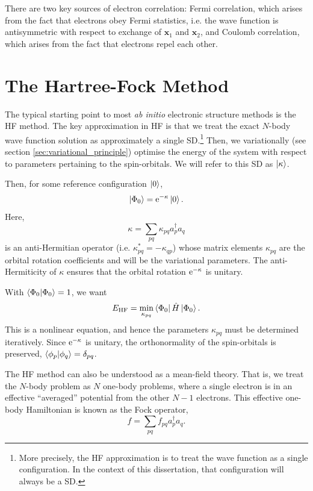 There are two key sources of electron correlation: Fermi correlation, which arises from the fact that electrons obey Fermi statistics, i.e. the wave function is antisymmetric with respect to exchange of $\bm x_1$ and $\bm x_2$, and Coulomb correlation, which arises from the fact that electrons repel each other.

\section{The Hartree-Fock Method}
\label{sec:hf}

The typical starting point to most \emph{ab initio} electronic structure methods is the \gls{HF} method.\cite{hartreeWave1928,fockNaherungsmethode1930,slaterNote1930} The key approximation in \gls{HF} is that we treat the exact $N$-body wave function solution as approximately a single \gls{SD}.\footnote{More precisely, the \gls{HF} approximation is to treat the wave function as a single configuration. In the context of this dissertation, that configuration will always be a \gls{SD}.} Then, we variationally (see section \ref{sec:variational_principle}) optimise the energy of the system with respect to parameters pertaining to the spin-orbitals. We will refer to this \gls{SD} as $\ket{\kappa}$.

Then, for some reference configuration $\ket 0$,
\begin{equation}
\ket{\Phi_0} = \mathrm{e}^{-\kappa} \ket 0.
\end{equation}
Here,
\begin{equation}
\kappa = \sum_{pq} \kappa_{pq}a_p^\dag a_q
\end{equation}
is an anti-Hermitian operator (i.e. $\kappa_{pq}^* = -\kappa_{qp}$) whose matrix elements $\kappa_{pq}$ are the orbital rotation coefficients and will be the variational parameters. The anti-Hermiticity of $\kappa$ ensures that the orbital rotation $\mathrm{e}^{-\kappa}$ is unitary.

With $\braket{\Phi_0}=1$, we want
\begin{equation}
E_\mathrm{HF} = \min_{\kappa_{pq}}\bra{\Phi_0}\hat H\ket{\Phi_0}.
\end{equation}
This is a nonlinear equation, and hence the parameters $\kappa_{pq}$ must be determined iteratively. Since $\mathrm{e}^{-\kappa}$ is unitary, the orthonormality of the spin-orbitals is preserved, $\bra{\phi_p}\ket{\phi_q} = \delta_{pq}$.

The \gls{HF} method can also be understood as a mean-field theory. That is, we treat the $N$-body problem as $N$ one-body problems, where a single electron is in an effective ``averaged'' potential from the other $N-1$ electrons. This effective one-body Hamiltonian is known as the Fock operator,
\begin{equation}
    \label{eq:fock-operator}
    f = \sum_{pq} f_{pq} a_p^\dag a_q.
\end{equation}

